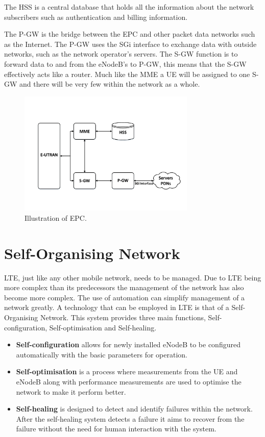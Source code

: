 The HSS is a central database that holds all the information about the network subscribers such as authentication and billing information.

The P-GW is the bridge between the EPC and other packet data networks such as the Internet. The P-GW uses the SGi interface to exchange data with outside networks, such as the network operator's servers.
The S-GW function is to forward data to and from the eNodeB's to P-GW, this means that the S-GW effectively acts like a router. Much like the MME a UE will be assigned to one S-GW and there will be very few within the network as a whole.~\cite{cox2012introduction, 3gpp2013network}
\begin{figure}[H]
  \begin{center}
    	  \includegraphics[width=0.75\textwidth]{figures/lte/epc.pdf}
    \end{center}
    \caption{Illustration of EPC.}
    \label{fig:epc}
\end{figure}
\section{Self-Organising Network}\label{self organising network}
LTE, just like any other mobile network, needs to be managed. Due to LTE being more complex than its predecessors the management of the network has also become more complex. The use of automation can simplify management of a network greatly. A technology that can be employed in LTE is that of a Self-Organising Network. This system provides three main functions, Self-configuration, Self-optimisation and Self-healing.~\cite{feng2008self,3gpp2011self}
\begin{itemize}
  \item \textbf{Self-configuration} allows for newly installed eNodeB to be configured automatically with the basic parameters for operation.  
  \item \textbf{Self-optimisation} is a process where measurements from the UE and eNodeB along with performance measurements are used to optimise the network to make it perform better.
  \item \textbf{Self-healing} is designed to detect and identify failures within the network. After the self-healing system detects a failure it aims to recover from the failure without the need for human interaction with the system.
\end{itemize}
